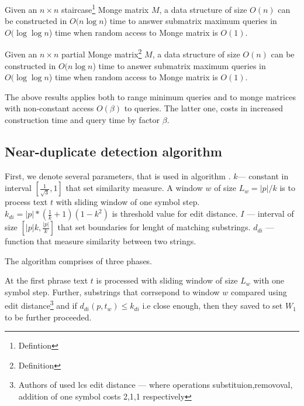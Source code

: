 \begin{theorem}\cite{}
Given an $n \times n$ staircase\footnote{Defintion} Monge matrix $M$, a data structure of size $O(n)$ can be
constructed in $O(n \log n$) time to answer submatrix maximum queries in $O(\log \log n$) time when random access to Monge matrix is $O(1)$.
\end{theorem}


\begin{theorem}\cite{}
Given an $n \times n$ partial Monge matrix\footnote{Definition} $M$, a data structure of size $O(n)$ can be
constructed in $O(n \log n$) time to answer submatrix maximum queries in $O(\log \log n$) time when random access to Monge matrix is $O(1)$.
\end{theorem}

The above results applies both to range  minimum queries and to monge matrices with non-constant access $O(\beta)$ to queries.
The latter one, costs in  increased construction time and query time by factor $\beta$. 

  





\subsection{Near-duplicate detection algorithm}
First, we denote several parameters, that is used in algorithm \cite{}.
$k$--- constant in interval $[\frac{1}{\sqrt{3}},1]$ that set similarity measure.  
A window $w$ of size $L_{w} = |p|/k$ is to process text $t$ with
sliding window of one symbol step.
$k_{di} = |p|*(\frac{1}{k}+1)(1-k^2)$ is threshold value for edit distance.
$I$ --- interval of size $[|p|k,\frac{|p|}{k}]$ that set boundaries for lenght of matching substrings.
$d_{di}$ --- function that measure similarity between two strings.

The algorithm comprises of three phases.

At the first phrase  text $t$ is processed with sliding window of size $L_{w}$ with one symbol step.
Further, substrings that corrsepond to window $w$ compared using edit distance\footnote{Authors of \cite{} used lcs edit distance --- where  operations substituion,removoval, addition of one symbol costs 2,1,1 respectively} and if $d_{di}(p,t_{w}) \leq k_{di}$ i.e  close enough, then they saved to set $W_{1}$ to be further proceeded. 

